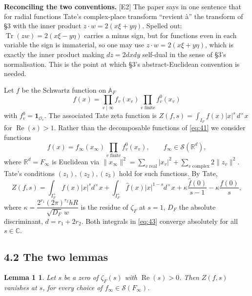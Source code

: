 \documentclass[11pt,reqno]{amsart}
\theoremstyle{plain}
\newtheorem*{lemA}{Lemma 1}
\theoremstyle{definition}
\theoremstyle{remark}
\newcommand{\R}{\mathbb{R}}
\newcommand{\C}{\mathbb{C}}
\newcommand{\Ss}{\mathcal{S}}
\newcommand{\fh}{\widehat{f}}
\DeclareMathOperator{\Tr}{Tr}
\newcommand{\Ledger}[1]{{\scriptsize\textsf{[#1]}}}
\begin{document}
\begin{ournotation}
\textbf{Reconciling the two conventions.} \Ledger{E2} The paper says in one sentence
that for radial functions Tate's complex-place transform ``revient \`a'' the
transform of \S3 with the inner product $z\cdot w=2(x\xi+y\eta)$. Spelled out:
$\Tr(zw)=2(x\xi-y\eta)$ carries a minus sign, but for functions even in each variable
the sign is immaterial, so one may use $z\cdot w=2(x\xi+y\eta)$, which is exactly the
inner product making $dz=2dxdy$ self-dual in the sense of \S3's normalisation. This
is the point at which \S3's abstract-Euclidean convention is needed.
\end{ournotation}

Let $f$ be the Schwartz function on $\mathbb A_F$
\begin{equation}\label{eq:41}
 f(x)=\prod_{v\mid\infty}f_v(x_v)\prod_{v\text{ finite}}f_v^0(x_v)
\end{equation}
with $f_v^0=\mathbf 1_{\mathcal O_v}$. The associated Tate zeta function is
$Z(f,s)=\int_{I_F}f(x)|x|^s\,d^\times x$ for $\operatorname{Re}(s)>1$. Rather than the
decomposable functions of \eqref{eq:41} we consider functions
\begin{equation}\label{eq:42}
 f(x)=f_\infty(x_\infty)\prod_{v\text{ finite}}f_v^0(x_v),\qquad
 f_\infty\in\Ss(\R^d),
\end{equation}
where $\R^d=F_\infty$ is Euclidean via
$\|x_\infty\|^2=\sum_{v\text{ real}}|x_v|^2+\sum_{v\text{ complex}}2\|z_v\|^2$.
Tate's conditions $(z_1),(z_2),(z_3)$ hold for such functions. By Tate,
\begin{equation}\label{eq:43}
 Z(f,s)=\int_{I_F^+}f(x)|x|^sd^\times x+\int_{I_F^+}\fh(x)|x|^{1-s}d^\times x
       +\kappa\frac{\fh(0)}{s-1}-\kappa\frac{f(0)}{s},
\end{equation}
where $\kappa=\dfrac{2^{r_1}(2\pi)^{r_2}hR}{\sqrt{D_F}\,w}$ is the residue of
$\zeta_F$ at $s=1$, $D_F$ the absolute discriminant, $d=r_1+2r_2$. Both integrals in
\eqref{eq:43} converge absolutely for all $s\in\C$.

\subsection*{4.2 The two lemmas}

\begin{lemA}
Let $s$ be a zero of $\zeta_F(s)$ with $\operatorname{Re}(s)>0$. Then $Z(f,s)$
vanishes at $s$, for every choice of $f_\infty\in\Ss(F_\infty)$.
\end{lemA}
\end{document}
